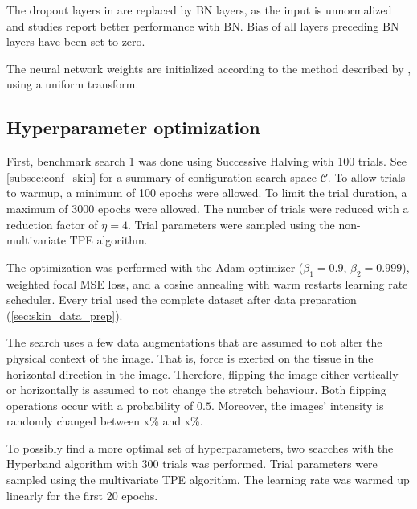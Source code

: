 The dropout layers in \cite{Soylu2022} are replaced by BN layers, as the input is unnormalized and studies report better performance with BN.
Bias of all layers preceding BN layers have been set to zero.

The neural network weights are initialized according to the method described by \textcite{He2015a}, using a uniform transform.

\subsection{Hyperparameter optimization}
First, benchmark search 1 was done using Successive Halving with 100 trials.
See \cref{subsec:conf_skin} for a summary of configuration search space $\mathcal{C}$.
To allow trials to warmup, a minimum of 100 epochs were allowed.
To limit the trial duration, a maximum of 3000 epochs were allowed.
The number of trials were reduced with a reduction factor of $\eta=4$.
Trial parameters were sampled using the non-multivariate TPE algorithm.

The optimization was performed with the Adam optimizer ($\beta_1=0.9$, $\beta_2=0.999$), weighted focal MSE loss, and a cosine annealing with warm restarts learning rate scheduler.
Every trial used the complete dataset after data preparation (\cref{sec:skin_data_prep}).

The search uses a few data augmentations that are assumed to not alter the physical context of the image.
That is, force is exerted on the tissue in the horizontal direction in the image.
Therefore, flipping the image either vertically or horizontally is assumed to not change the stretch behaviour.
Both flipping operations occur with a probability of $0.5$.
Moreover, the images' intensity is randomly changed between x\% and x\%.

To possibly find a more optimal set of hyperparameters, two searches with the Hyperband algorithm with 300 trials was performed.
Trial parameters were sampled using the multivariate TPE algorithm.
The learning rate was warmed up linearly for the first 20 epochs.


